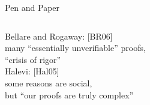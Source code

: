 \begin{frame}{Pen and Paper}
\begin{columns}[c]
\begin{column}{.68\linewidth}
      Bellare and Rogaway: [BR06]\\
      \hspace{1.618em} many “essentially unverifiable” proofs,\\
      \hspace{1.618em} “crisis of rigor”\\[1.5em]

      Halevi: [Hal05]\\
      \hspace{1.618em} some reasons are social,\\
      \hspace{1.618em} but “our proofs are truly complex”\\[1.5em]



    \end{column}
  \end{columns}
\end{frame}




